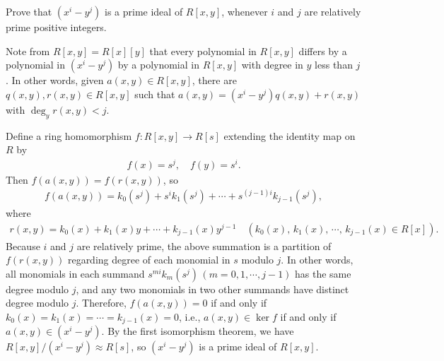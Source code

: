 \begin{prob}
    Prove that $(x^i-y^j)$ is a prime ideal of $R[x, y]$, whenever $i$ and $j$ are relatively prime positive integers.
\end{prob}
\begin{sol}
    Note from $R[x, y]=R[x][y]$ that every polynomial in $R[x, y]$ differs by a polynomial in $(x^i-y^j)$ by a polynomial in $R[x, y]$ with degree in $y$ less than $j$.
    In other words, given $a(x, y)\in R[x, y]$, there are $q(x, y), r(x, y)\in R[x, y]$ such that $a(x, y)=(x^i-y^j)q(x, y)+r(x, y)$ with $\deg_y r(x, y)<j$.

    Define a ring homomorphism $f: R[x, y]\rightarrow R[s]$ extending the identity map on $R$ by
    \begin{align*}
        f(x)=s^j,\quad f(y)=s^i.
    \end{align*}
    Then $f(a(x, y))=f(r(x, y))$, so
    \begin{align*}
        f(a(x, y))=k_0(s^j)+s^i k_1(s^j)+\cdots+s^{(j-1)i} k_{j-1}(s^j),
    \end{align*}
    where
    \begin{align*}
        r(x, y)=k_0(x)+k_1(x)y+\cdots+k_{j-1}(x)y^{j-1}\quad(k_0(x),\,k_1(x),\,\cdots,\,k_{j-1}(x)\in R[x]).
    \end{align*}
    Because $i$ and $j$ are relatively prime, the above summation is a partition of $f(r(x, y))$ regarding degree of each monomial in $s$ modulo $j$.
    In other words, all monomials in each summand $s^{mi} k_m(s^j)\,(m=0, 1, \cdots, j-1)$ has the same degree modulo $j$, and any two monomials in two other summands have distinct degree modulo $j$.
    Therefore, $f(a(x, y))=0$ if and only if $k_0(x)=k_1(x)=\cdots=k_{j-1}(x)=0$, i.e., $a(x, y)\in\ker f$ if and only if $a(x, y)\in(x^i-y^j)$.
    By the first isomorphism theorem, we have $R[x, y]/(x^i-y^j)\approx R[s]$, so $(x^i-y^j)$ is a prime ideal of $R[x, y]$.
\end{sol}
